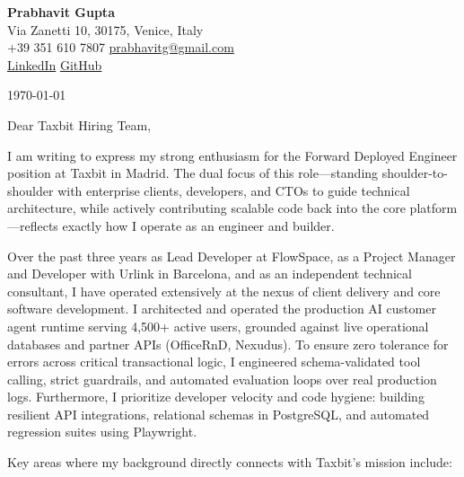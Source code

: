 \documentclass[11pt,a4paper]{article}
\begin{document}
\begin{center}
    {\huge \textbf{Prabhavit Gupta}} \\
    \vspace{4pt}
    Via Zanetti 10, 30175, Venice, Italy \\
    +39 351 610 7807 \textbar{} \href{mailto:prabhavitg@gmail.com}{prabhavitg@gmail.com} \\
    \href{https://www.linkedin.com/in/prabhavit/}{LinkedIn} \textbar{} \href{https://github.com/prab-gupta}{GitHub}
\end{center}

\vspace{12pt}

\noindent \today

\vspace{6pt}

\noindent Dear Taxbit Hiring Team,

\vspace{6pt}

\noindent I am writing to express my strong enthusiasm for the Forward Deployed Engineer position at Taxbit in Madrid. The dual focus of this role—standing shoulder-to-shoulder with enterprise clients, developers, and CTOs to guide technical architecture, while actively contributing scalable code back into the core platform—reflects exactly how I operate as an engineer and builder.

\noindent Over the past three years as Lead Developer at FlowSpace, as a Project Manager and Developer with Urlink in Barcelona, and as an independent technical consultant, I have operated extensively at the nexus of client delivery and core software development. I architected and operated the production AI customer agent runtime serving 4,500+ active users, grounded against live operational databases and partner APIs (OfficeRnD, Nexudus). To ensure zero tolerance for errors across critical transactional logic, I engineered schema-validated tool calling, strict guardrails, and automated evaluation loops over real production logs. Furthermore, I prioritize developer velocity and code hygiene: building resilient API integrations, relational schemas in PostgreSQL, and automated regression suites using Playwright.

\noindent Key areas where my background directly connects with Taxbit's mission include:
\end{document}
